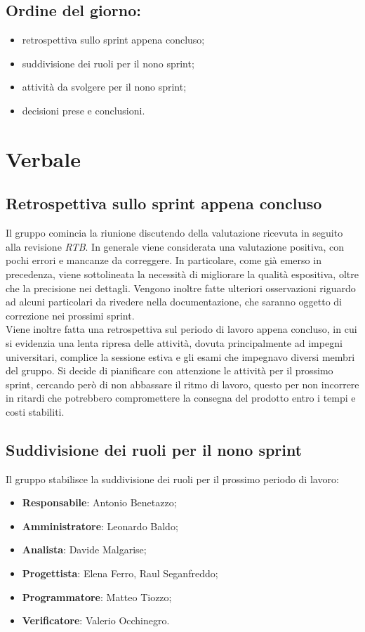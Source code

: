 \documentclass[italian,12pt]{article}
\begin{document}
\subsection*{Ordine del giorno:}
\begin{itemize}
	\item retrospettiva sullo sprint appena concluso;
	\item suddivisione dei ruoli per il nono sprint;
	\item attività da svolgere per il nono sprint;
	\item decisioni prese e conclusioni.
\end{itemize}


\newpage

\section{Verbale}

\subsection{Retrospettiva sullo sprint appena concluso}
Il gruppo comincia la riunione discutendo della valutazione ricevuta in seguito alla revisione \textit{RTB}. In generale viene considerata una valutazione positiva, con pochi errori e mancanze da correggere. In particolare, come già emerso in precedenza, viene sottolineata la necessità di migliorare la qualità espositiva, oltre che la precisione nei dettagli. Vengono inoltre fatte ulteriori osservazioni riguardo ad alcuni particolari da rivedere nella documentazione, che saranno oggetto di correzione nei prossimi sprint. \\
Viene inoltre fatta una retrospettiva sul periodo di lavoro appena concluso, in cui si evidenzia una lenta ripresa delle attività, dovuta principalmente ad impegni universitari, complice la sessione estiva e gli esami che impegnavo diversi membri del gruppo. Si decide di pianificare con attenzione le attività per il prossimo sprint, cercando però di non abbassare il ritmo di lavoro, questo per non incorrere in ritardi che potrebbero compromettere la consegna del prodotto entro i tempi e costi stabiliti.

\subsection{Suddivisione dei ruoli per il nono sprint}
Il gruppo stabilisce la suddivisione dei ruoli per il prossimo periodo di lavoro:
\begin{itemize}
	\item \textbf{Responsabile}: Antonio Benetazzo;
	\item \textbf{Amministratore}: Leonardo Baldo;
	\item \textbf{Analista}: Davide Malgarise;
	\item \textbf{Progettista}: Elena Ferro, Raul Seganfreddo;
	\item \textbf{Programmatore}: Matteo Tiozzo;
	\item \textbf{Verificatore}: Valerio Occhinegro.
\end{itemize}
\end{document}
